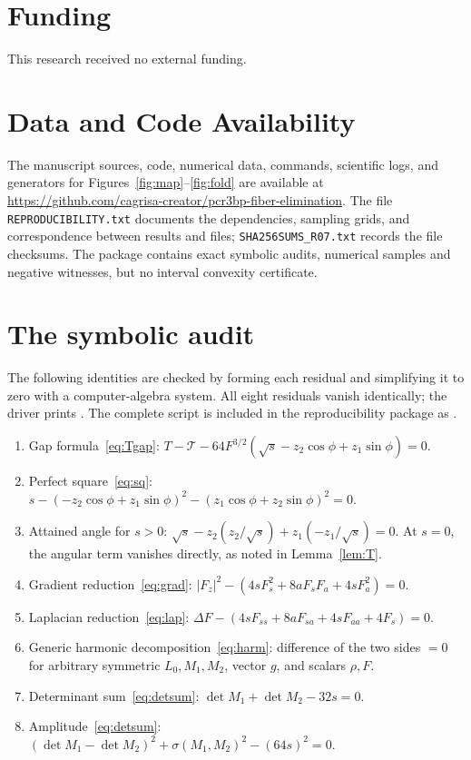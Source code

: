 \documentclass[11pt,reqno]{amsart}
\theoremstyle{plain}
\theoremstyle{definition}
\newcommand{\calT}{\mathcal{T}}
\newcommand{\Fz}{F_{z}}
\begin{document}
\section*{Funding}

This research received no external funding.

\section*{Data and Code Availability}

The manuscript sources, code, numerical data, commands, scientific logs, and generators for Figures~\ref{fig:map}--\ref{fig:fold} are available at \url{https://github.com/cagrisa-creator/pcr3bp-fiber-elimination}. The file \texttt{REPRODUCIBILITY.txt} documents the dependencies, sampling grids, and correspondence between results and files; \texttt{SHA256SUMS\_R07.txt} records the file checksums. The package contains exact symbolic audits, numerical samples and negative witnesses, but no interval convexity certificate.

\appendix

\section{The symbolic audit}\label{app:audit}

The following identities are checked by forming each residual and simplifying it to zero with a computer-algebra system. All eight residuals vanish identically; the driver prints . The complete script is included in the reproducibility package as .

\begin{enumerate}
\item[R1] Gap formula~\eqref{eq:Tgap}: $T-\calT-64F^{3/2}(\sqrt s-z_2\cos\phi+z_1\sin\phi)=0$.
\item[R2] Perfect square~\eqref{eq:sq}: $s-(-z_2\cos\phi+z_1\sin\phi)^2-(z_1\cos\phi+z_2\sin\phi)^2=0$.
\item[R3] Attained angle for $s>0$: $\sqrt s-z_2(z_2/\sqrt s)+z_1(-z_1/\sqrt s)=0$. At $s=0$, the angular term vanishes directly, as noted in Lemma~\ref{lem:T}.
\item[R4] Gradient reduction~\eqref{eq:grad}: $|\Fz|^2-(4sF_s^2+8aF_sF_a+4sF_a^2)=0$.
\item[R5] Laplacian reduction~\eqref{eq:lap}: $\Delta F-(4sF_{ss}+8aF_{sa}+4sF_{aa}+4F_s)=0$.
\item[R6] Generic harmonic decomposition~\eqref{eq:harm}: difference of the two sides $=0$ for arbitrary symmetric $L_0,M_1,M_2$, vector $g$, and scalars $\rho,F$.
\item[R7] Determinant sum~\eqref{eq:detsum}: $\det M_1+\det M_2-32s=0$.
\item[R8] Amplitude~\eqref{eq:detsum}: $(\det M_1-\det M_2)^2+\sigma(M_1,M_2)^2-(64s)^2=0$.
\end{enumerate}
\end{document}
